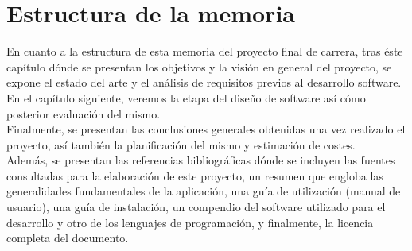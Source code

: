 \section{Estructura de la memoria}

En cuanto a la estructura de esta memoria del proyecto final de carrera, tras éste capítulo dónde se presentan los objetivos y la visión en general del proyecto, se expone el estado del arte y el análisis de requisitos previos al desarrollo software.\\

En el capítulo siguiente, veremos la etapa del diseño de software así cómo posterior evaluación del mismo.\\

Finalmente, se presentan las conclusiones generales obtenidas una vez realizado el proyecto, así también la planificación del mismo y estimación de costes.\\

Además, se presentan las referencias bibliográficas dónde se incluyen las fuentes consultadas para la elaboración de este proyecto, un resumen que engloba las generalidades fundamentales de la aplicación, una guía de utilización (manual de usuario), una guía de instalación, un compendio del software utilizado para el desarrollo y otro de los lenguajes de programación, y finalmente, la licencia completa del documento.\\
